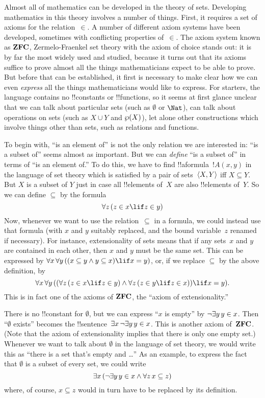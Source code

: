 \documentclass[../../../include/open-logic-section]{subfiles}
\begin{document}


Almost all of mathematics can be developed in the theory of sets.
Developing mathematics in this theory involves a number of things.
First, it requires a set of axioms for the relation~$\in$.  A number
of different axiom systems have been developed, sometimes with
conflicting properties of~$\in$.  The axiom system known as
$\Log{ZFC}$, Zermelo-Fraenkel set theory with the axiom of choice
stands out: it is by far the most widely used and studied, because it
turns out that its axioms suffice to prove almost all the things
mathematicians expect to be able to prove.  But before that can be
established, it first is necessary to make clear how we can even
\emph{express} all the things mathematicians would like to express.
For starters, the language contains no !!{constant}s or !!{function}s,
so it seems at first glance unclear that we can talk about particular
sets (such as $\emptyset$ or $\Nat$), can talk about operations on
sets (such as $X \cup Y$ and $\wp(X)$), let alone other
constructions which involve things other than sets, such as relations
and functions.

To begin with, ``is an element of'' is not the only relation we are
interested in: ``is a subset of'' seems almost as important.  But we
can \emph{define} ``is a subset of'' in terms of ``is an element of.''
To do this, we have to find !!a{formula}~$!A(x, y)$ in
the language of set theory which is satisfied by a pair of
sets~$\langle X, Y \rangle$ iff $X \subseteq Y$.  But $X$ is a subset of $Y$
just in case all !!{element}s of~$X$ are also !!{element}s of~$Y$.  So
we can define $\subseteq$ by the formula
\[
\lforall[z][(z \in x \lif z \in y)]
\]
Now, whenever we want to use the relation~$\subseteq$ in a formula, we
could instead use that formula (with $x$ and $y$ suitably replaced,
and the bound variable~$z$ renamed if necessary).  For instance,
extensionality of sets means that if any sets~$x$ and $y$ are
contained in each other, then $x$ and $y$ must be the same set. This
can be expressed by $\lforall[x][\lforall[y][((x \subseteq y \land y
    \subseteq x) \lif x = y)]]$, or, if we replace $\subseteq$ by the
above definition, by
\[
\lforall[x][\lforall[y][((\lforall[z][(z \in x \lif z \in y)] \land
    \lforall[z][(z \in y \lif z \in x)]) \lif x = y)]].
\]
This is in fact one of the axioms of $\Log{ZFC}$, the ``axiom of
extensionality.''

There is no !!{constant} for $\emptyset$, but we can express ``$x$ is
empty'' by $\lnot \lexists[y][y \in x]$.  Then ``$\emptyset$ exists''
becomes the !!{sentence}~$\lexists[x][\lnot \lexists[y][y \in
    x]]$. This is another axiom of~$\Log{ZFC}$.  (Note that the axiom
of extensionality implies that there is only one empty set.)  Whenever
we want to talk about $\emptyset$ in the language of set theory, we
would write this as ``there is a set that's empty and \dots'' As an
example, to express the fact that $\emptyset$ is a subset of every
set, we could write
\[
\lexists[x][(\lnot\lexists[y][y \in x] \land \lforall[z][x \subseteq
    z])]
\]
where, of course, $x \subseteq z$ would in turn have to be replaced by
its definition.
\end{document}

